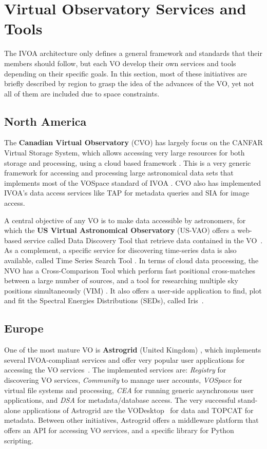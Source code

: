 \section{Virtual Observatory Services and Tools}
\label{sec:vo_services}

The IVOA architecture only defines a general framework and
standards that their members should follow, but each VO develop
their own services and tools depending on their specific goals.
In this section, most of these initiatives are briefly
described by region to grasp the idea of the advances of
the VO, yet not all of them are included due to space 
constraints.

\subsection{North America}

The \textbf{Canadian Virtual Observatory} (CVO) has largely focus on the CANFAR Virtual Storage
System, which
allows accessing very large resources for both storage and processing, 
using a cloud based framework \cite{Gaudet2011}. 
This is a very generic framework for accessing and processing 
large astronomical data sets that implements most of the
VOSpace standard of IVOA \cite{Graham2007a}. CVO also has implemented
IVOA's data access services like TAP for metadata queries 
and SIA for image access.

A central objective of any VO is to make data accessible by astronomers,
for which the \textbf{US Virtual Astronomical Observatory} (US-VAO) 
offers a web-based service called Data Discovery Tool 
that retrieve data contained in the VO~\cite{McGlynn2013}. 
As a complement, a specific service for discovering time-series data
is also available, called Time Series Search Tool \cite{Graham2012}.
In terms of cloud data processing, the NVO has a Cross-Comparison Tool 
which perform fast positional cross-matches between a large number of 
sources, and a tool for researching multiple sky positions simultaneously (VIM)
\cite{Hanisch2012}.
It also offers a user-side application to find, plot and fit the
Spectral Energies Distributions (SEDs), called Iris~\cite{Laurino2013}.

\subsection{Europe}

One of the most mature VO is \textbf{Astrogrid} (United Kingdom)
\cite{Lawrence2002}, which implements
several IVOA-compliant services and offer very popular user applications
for accessing the VO services~\cite{Lawence2009}.
The implemented services are: \emph{Registry}
for discovering VO services, \emph{Community} to manage user accounts, 
\emph{VOSpace} for virtual file systems and processing, \emph{CEA} for running
generic asynchronous user applications, and \emph{DSA} for metadata/database
access. The very successful stand-alone applications of Astrogrid are 
the VODesktop~\cite{Tedds2008} for data and
TOPCAT \cite{Graham2007} for metadata.
Between other initiatives, Astrogrid offers a middleware platform 
that offers an API for accessing VO services, and a specific 
library for Python scripting.

